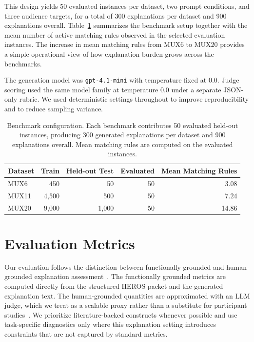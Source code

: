 \documentclass[sigconf,nonacm]{acmart}
\begin{document}
This design yields 50 evaluated instances per dataset, two prompt conditions, and three audience targets, for a total of 300 explanations per dataset and 900 explanations overall. Table~\ref{tab:benchmarks} summarizes the benchmark setup together with the mean number of active matching rules observed in the selected evaluation instances. The increase in mean matching rules from MUX6 to MUX20 provides a simple operational view of how explanation burden grows across the benchmarks.

The generation model was \texttt{gpt-4.1-mini} with temperature fixed at 0.0. Judge scoring used the same model family at temperature 0.0 under a separate JSON-only rubric. We used deterministic settings throughout to improve reproducibility and to reduce sampling variance.

\begin{table}[t]
\caption{Benchmark configuration. Each benchmark contributes 50 evaluated held-out instances, producing 300 generated explanations per dataset and 900 explanations overall. Mean matching rules are computed on the evaluated instances.}
\label{tab:benchmarks}
\centering
\begin{tabular}{lrrrr}
\toprule
\textbf{Dataset} & \textbf{Train} & \textbf{Held-out Test} & \textbf{Evaluated} & \textbf{Mean Matching Rules} \\
\midrule
MUX6  & 450  & 50   & 50 & 3.08 \\
MUX11 & 4{,}500 & 500  & 50 & 7.24 \\
MUX20 & 9{,}000 & 1{,}000 & 50 & 14.86 \\
\bottomrule
\end{tabular}
\end{table}

\section{Evaluation Metrics}
Our evaluation follows the distinction between functionally grounded and human-grounded explanation assessment~\cite{doshivelez2017rigorous}. The functionally grounded metrics are computed directly from the structured HEROS packet and the generated explanation text. The human-grounded quantities are approximated with an LLM judge, which we treat as a scalable proxy rather than a substitute for participant studies~\cite{liu2023geval,huang2025judge}. We prioritize literature-backed constructs whenever possible and use task-specific diagnostics only where this explanation setting introduces constraints that are not captured by standard metrics.
\end{document}
